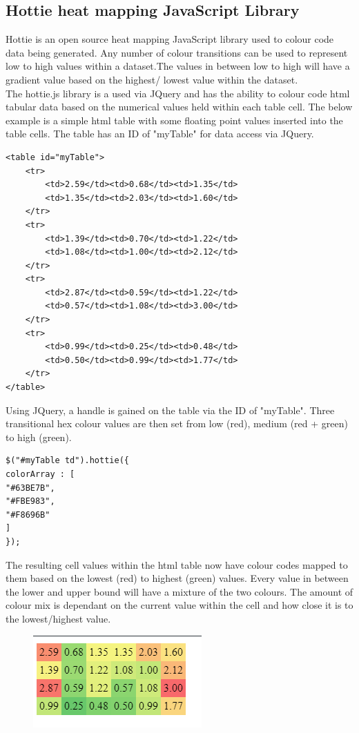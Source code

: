 \subsection{Hottie heat mapping JavaScript Library}
Hottie is an open source heat mapping JavaScript library used to colour code data being generated. Any number of colour transitions can be used to represent low to high values within a dataset.The values in between low to high will have a gradient value based on the highest/ lowest value within the dataset.~\cite{HeatMap:online}\\
The hottie.js library is a used via JQuery and has the ability to colour code html tabular data based on the numerical values held within each table cell. The below example is a simple html table with some floating point values inserted into the table cells. The table has an ID of "myTable" for data access via JQuery.~\cite{HottieExample:online}
\begin{verbatim}
<table id="myTable">
	<tr>
		<td>2.59</td><td>0.68</td><td>1.35</td>
		<td>1.35</td><td>2.03</td><td>1.60</td>
	</tr>
	<tr>
		<td>1.39</td><td>0.70</td><td>1.22</td>
		<td>1.08</td><td>1.00</td><td>2.12</td>
	</tr>
	<tr>
		<td>2.87</td><td>0.59</td><td>1.22</td>
		<td>0.57</td><td>1.08</td><td>3.00</td>
	</tr>
	<tr>
		<td>0.99</td><td>0.25</td><td>0.48</td>
		<td>0.50</td><td>0.99</td><td>1.77</td>
	</tr>
</table>
\end{verbatim}
Using JQuery, a handle is gained on the table via the ID of "myTable". Three transitional hex colour values are then set from low (red), medium (red + green) to high (green).~\cite{HottieExample:online}
\begin{verbatim}
$("#myTable td").hottie({
colorArray : [ 
"#63BE7B",
"#FBE983",
"#F8696B"
]
});
\end{verbatim}
The resulting cell values within the html table now have colour codes mapped to them based on the lowest (red) to highest (green) values. Every value in between the lower and upper bound will have a mixture of the two colours. The amount of colour mix is dependant on the current value within the cell and how close it is to the lowest/highest value.~\cite{HeatMap:online}~\cite{HottieExample:online}\\
\begin{figure}[H]
	\centering
	\includegraphics[width=0.7\linewidth]{img/HeatMap}
	\caption{}
	\label{fig:heatmap result}
\end{figure}

